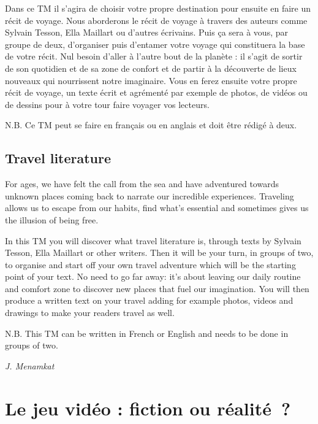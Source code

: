 \documentclass[
  10pt,
  french,
  a5paper,
  openany]{book}
\newenvironment{signature}{\begin{flushright}}{\end{flushright}}
\begin{document}
Dans ce TM il s'agira de choisir votre propre destination pour ensuite en faire un récit de voyage. Nous aborderons le récit de voyage à travers des auteurs comme Sylvain Tesson, Ella Maillart ou d'autres écrivains. Puis ça sera à vous, par groupe de deux, d'organiser puis d'entamer votre voyage qui constituera la base de votre récit. Nul besoin d'aller à l'autre bout de la planète : il s'agit de sortir de son quotidien et de sa zone de confort et de partir à la découverte de lieux nouveaux qui nourrissent notre imaginaire. Vous en ferez ensuite votre propre récit de voyage, un texte écrit et agrémenté par exemple de photos, de vidéos ou de dessins pour à votre tour faire voyager vos lecteurs.

N.B. Ce TM peut se faire en français ou en anglais et doit être rédigé à deux.

\hypertarget{travel-literature}{%
\section*{Travel literature}\label{travel-literature}}

For ages, we have felt the call from the sea and have adventured towards unknown places coming back to narrate our incredible experiences. Traveling allows us to escape from our habits, find what's essential and sometimes gives us the illusion of being free.

In this TM you will discover what travel literature is, through texts by Sylvain Tesson, Ella Maillart or other writers. Then it will be your turn, in groups of two, to organise and start off your own travel adventure which will be the starting point of your text. No need to go far away: it's about leaving our daily routine and comfort zone to discover new places that fuel our imagination. You will then produce a written text on your travel adding for example photos, videos and drawings to make your readers travel as well.

N.B. This TM can be written in French or English and needs to be done in groups of two.

\begin{signature}
\emph{J. Menamkat}

\end{signature}

\hypertarget{le-jeu-viduxe9o-fiction-ou-ruxe9alituxe9}{%
\chapter{Le jeu vidéo : fiction ou réalité~?}\label{le-jeu-viduxe9o-fiction-ou-ruxe9alituxe9}}
\end{document}

